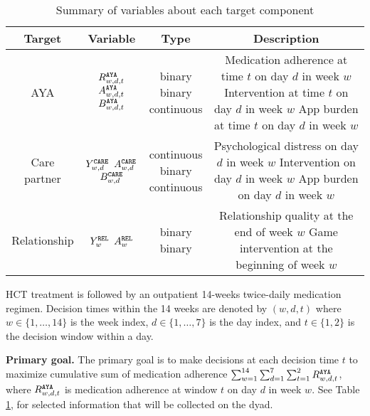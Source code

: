 %
%
\begin{table}[pht]
    \centering
    \caption{Summary of variables about each target component}
    \label{tab:variables}
    \begin{tabular}{c|c|c|c}
    \toprule
    Target & Variable & Type & Description \\
    \midrule
    AYA & \makecell{$R_{w,d,t}^{\tiny\texttt{AYA}}$ \\ $A_{w,d,t}^{\tiny\texttt{AYA}}$ \\ $B_{w,d,t}^{\tiny\texttt{AYA}}$} & \makecell{binary \\ binary \\ continuous} & \makecell{Medication adherence at time $t$ on day $d$ in week $w$ \\ Intervention at time $t$ on day $d$ in week $w$ \\ App burden at time $t$ on day $d$ in week $w$} \\
    \midrule
    Care partner & \makecell{$Y_{w,d}^{\tiny\texttt{CARE}}$ \\ $A_{w,d}^{\tiny\texttt{CARE}}$ \\ $B_{w,d}^{\tiny\texttt{CARE}}$} & \makecell{continuous \\ binary \\ continuous} & \makecell{Psychological distress on day $d$ in week $w$ \\ Intervention on day $d$ in week $w$ \\ App burden on day $d$ in week $w$} \\
    \midrule
    Relationship & \makecell{$Y_w^{\tiny\texttt{REL}}$ \\ $A_w^{\tiny\texttt{REL}}$} & \makecell{binary \\ binary} & \makecell{Relationship quality at the end of week $w$ \\ Game intervention at the beginning of week $w$} \\
    \bottomrule
    \end{tabular}
    \end{table}
%
%
%
HCT treatment is followed by  an outpatient 14-weeks twice-daily medication regimen. Decision times within the 14 weeks are denoted by $(w, d, t)$ where $w \in \{1, \dots, 14\}$ is the week index, $d \in \{1, \dots, 7\}$ is the day index, and $t \in \{1, 2\}$ is the decision window within a day. 

\textbf{Primary goal.} The primary goal is to make decisions at each decision time $t$ to maximize cumulative sum of medication adherence $\sum_{w=1}^{14}\sum_{d=1}^{7}\sum_{t=1}^{2}R_{w,d,t}^{\tiny\texttt{AYA}}$, where $R_{w,d,t}^{\tiny\texttt{AYA}}$ is medication adherence at window $t$ on day $d$ in week $w$. See Table \ref{tab:variables}, for selected information that will be collected on the dyad. 

